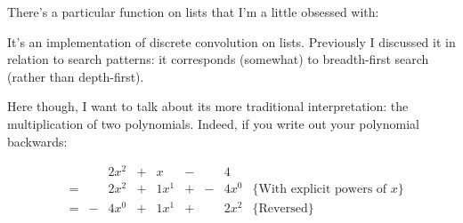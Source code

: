 \documentclass{article}
\begin{document}
There's a particular function on lists that I'm a little obsessed with:


It's an implementation of discrete convolution on lists. Previously I discussed
it in relation to search patterns: it corresponds (somewhat) to breadth-first
search (rather than depth-first).

Here though, I want to talk about its more traditional interpretation: the
multiplication of two polynomials. Indeed, if you write out your polynomial
backwards: 

\begin{align}
&   &   & 2x^2 & + & x    & - &   & 4    & \\
& = &   & 2x^2 & + & 1x^1 & + & - & 4x^0 &  \{ \text{With explicit powers of $x$} \} \\
& = & - & 4x^0 & + & 1x^1 & + &   & 2x^2 & \{ \text{Reversed} \}
\end{align}

\cite{rivas_monoids_2015}












\end{document}
